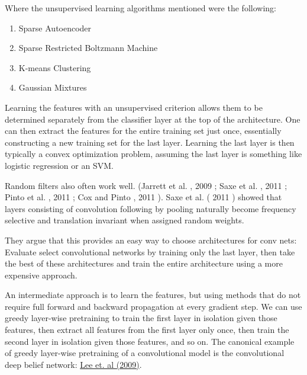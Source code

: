 \documentclass[onecolumn, letterpaper, 12pt]{report}
\begin{document}
Where the unsupervised learning algorithms mentioned were the following: 

\begin{enumerate}
\item Sparse Autoencoder 
\item Sparse Restricted Boltzmann Machine
\item K-means Clustering
\item Gaussian Mixtures
\end{enumerate}

Learning the features with an unsupervised criterion allows them to be determined separately from the classifier layer at the top of the architecture. One can then extract the features for the entire training set just once, essentially constructing a new training set for the last layer. Learning the last layer is then typically a convex optimization problem, assuming the last layer is something like logistic regression or an SVM. 

Random filters also often work well. (Jarrett et al. , 2009 ; Saxe et al. , 2011 ; Pinto et al. , 2011 ; Cox and Pinto , 2011 ). Saxe et al. ( 2011 ) showed that layers consisting of convolution following by pooling naturally become frequency selective and translation invariant when assigned random weights. 

They argue that this provides an easy way to choose architectures for conv nets: 
Evaluate select convolutional networks by training only the last layer, then take the best of these architectures and train the entire architecture using a more expensive approach. 

An intermediate approach is to learn the features, but using methods that do not require full forward and backward propagation at every gradient step. We can use greedy layer-wise pretraining to train the first layer in isolation given those features, then extract all features from the first layer only once, then train the second layer in isolation given those features, and so on. The canonical example of greedy layer-wise pretraining of a convolutional model is the convolutional deep belief network: \href{http://www.cnbc.cmu.edu/cns/papers/lee-CDBN.pdf}{Lee et. al (2009)}.
\end{document}
